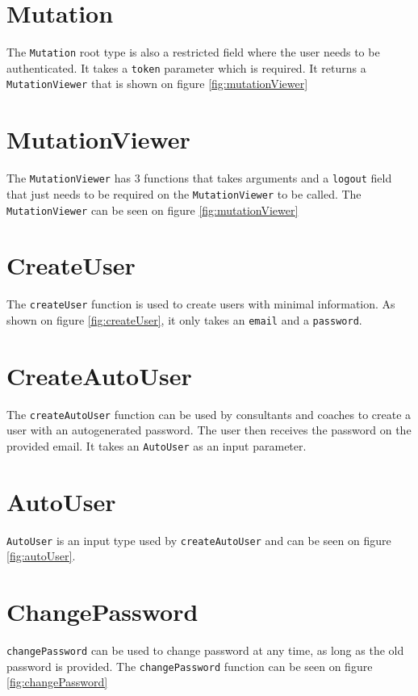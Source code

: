 \section{Mutation}
The \verb+Mutation+ root type is also a restricted field where the user needs to be authenticated. 
It takes a \verb+token+ parameter which is required. 
It returns a \verb+MutationViewer+ that is shown on figure \ref{fig:mutationViewer}

\section{MutationViewer}
The \verb+MutationViewer+ has 3 functions that takes arguments and a \verb+logout+ field that just needs to be required on the \verb+MutationViewer+ to be called. The \verb+MutationViewer+ can be seen on figure \ref{fig:mutationViewer}

\section{CreateUser}
The \verb+createUser+ function is used to create users with minimal information. 
As shown on figure \ref{fig:createUser}, it only takes an \verb+email+ and a \verb+password+.

\section{CreateAutoUser}
The \verb+createAutoUser+ function can be used by consultants and coaches to create a user with an autogenerated password.
The user then receives the password on the provided email.
It takes an \verb+AutoUser+ as an input parameter.

\section{AutoUser}
\verb+AutoUser+ is an input type used by \verb+createAutoUser+ and can be seen on figure \ref{fig:autoUser}.

\section{ChangePassword}
\verb+changePassword+ can be used to change password at any time, as long as the old password is provided.
The \verb+changePassword+ function can be seen on figure \ref{fig:changePassword}

